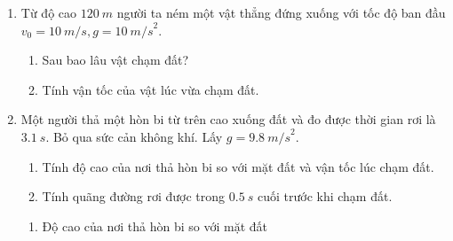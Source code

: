 \begin{enumerate}[label=\bfseries Bài \arabic*:,leftmargin=1.5cm]
	\item {}
	{
		
		Từ độ cao $\SI{120}{m}$ người ta ném một vật thẳng đứng xuống với tốc độ ban đầu $v_0 = \SI{10}{m/s}, g = \SI{10}{m/s}^2$.
		\begin{enumerate}[label=\alph*)]
			\item Sau bao lâu vật chạm đất?
			\item Tính vận tốc của vật lúc vừa chạm đất.
		\end{enumerate}
	}
	
	
	
	\item {}
	
	
	{
		Một người thả một hòn bi từ trên cao xuống đất và đo được thời gian rơi là $\SI{3,1}{s}$. Bỏ qua sức cản không khí. Lấy $g=\SI{9,8}{m/s}^2$.
		\begin{enumerate}[label=\alph*)]
			\item Tính độ cao của nơi thả hòn bi so với mặt đất và vận tốc lúc chạm đất.
			\item Tính quãng đường rơi được trong $\SI{0,5}{s}$ cuối trước khi chạm đất.
		\end{enumerate}
	}
	\hideall
	{	
		\begin{enumerate}[label=\alph*)]
			\item Độ cao của nơi thả hòn bi so với mặt đất 
			

\end{enumerate}}
\end{enumerate}
